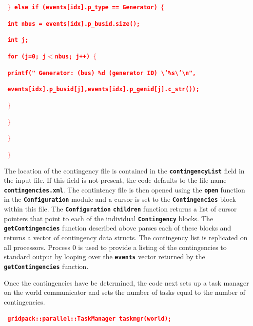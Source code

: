 \documentclass[12pt]{report} %
\begin{document}
\textcolor{red}{\texttt{\textbf{      $\boldsymbol{\mathrm{\}}}$ else if (events[idx].p\_type == Generator) $\boldsymbol{\mathrm{\{}}$}}}

\textcolor{red}{\texttt{\textbf{        int nbus = events[idx].p\_busid.size();}}}

\textcolor{red}{\texttt{\textbf{        int j;}}}

\textcolor{red}{\texttt{\textbf{        for (j=0; j$\boldsymbol{\mathrm{<}}$nbus; j++) $\boldsymbol{\mathrm{\{}}$}}}

\textcolor{red}{\texttt{\textbf{          printf(" Generator: (bus) \%d (generator ID) {\textbackslash}'\%s{\textbackslash}'{\textbackslash}n",}}}

\textcolor{red}{\texttt{\textbf{              events[idx].p\_busid[j],events[idx].p\_genid[j].c\_str());}}}

\textcolor{red}{\texttt{\textbf{        $\boldsymbol{\mathrm{\}}}$}}}

\textcolor{red}{\texttt{\textbf{      $\boldsymbol{\mathrm{\}}}$}}}

\textcolor{red}{\texttt{\textbf{    $\boldsymbol{\mathrm{\}}}$}}}

\textcolor{red}{\texttt{\textbf{  $\boldsymbol{\mathrm{\}}}$}}}

The location of the contingency file is contained in the \texttt{\textbf{contingencyList}} field in the input file. If this field is not present, the code defaults to the file name \texttt{\textbf{contingencies.xml}}. The contintency file is then opened using the \texttt{\textbf{open}} function in the \texttt{\textbf{Configuration}} module and a cursor is set to the \texttt{\textbf{Contingencies}} block within this file. The \texttt{\textbf{Configuration}} \texttt{\textbf{children}} function returns a list of cursor pointers that point to each of the individual \texttt{\textbf{Contingency}} blocks. The \texttt{\textbf{getContingencies}} function described above parses each of these blocks and returns a vector of contingency data structs. The contingency list is replicated on all processors. Process 0 is used to provide a listing of the contingencies to standard output by looping over the \texttt{\textbf{events}} vector returned by the \texttt{\textbf{getContingencies}} function.

Once the contingencies have be determined, the code next sets up a task manager on the world communicator and sets the number of tasks equal to the number of contingencies.

\textcolor{red}{\texttt{\textbf{  gridpack::parallel::TaskManager taskmgr(world);}}}
\end{document}
